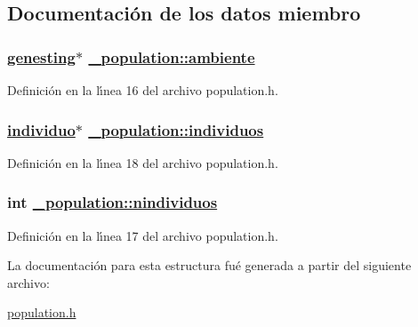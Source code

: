 \subsection{Documentaci\'{o}n de los datos miembro}
\hypertarget{struct__population_68ccc9819f5face92f988074d5b1a8af_68ccc9819f5face92f988074d5b1a8af}{
\subsubsection[ambiente]{\setlength{\rightskip}{0pt plus 5cm}\hyperlink{struct__genesting}{genesting}$\ast$ \hyperlink{struct__population_68ccc9819f5face92f988074d5b1a8af_68ccc9819f5face92f988074d5b1a8af}{\_\-population::ambiente}}}
\label{struct__population_68ccc9819f5face92f988074d5b1a8af_68ccc9819f5face92f988074d5b1a8af}




Definici\'{o}n en la l\'{\i}nea 16 del archivo population.h.\hypertarget{struct__population_3c05b6054f79c3c7993559e3148752a9_3c05b6054f79c3c7993559e3148752a9}{
\subsubsection[individuos]{\setlength{\rightskip}{0pt plus 5cm}\hyperlink{struct__individuo}{individuo}$\ast$ \hyperlink{struct__population_3c05b6054f79c3c7993559e3148752a9_3c05b6054f79c3c7993559e3148752a9}{\_\-population::individuos}}}
\label{struct__population_3c05b6054f79c3c7993559e3148752a9_3c05b6054f79c3c7993559e3148752a9}




Definici\'{o}n en la l\'{\i}nea 18 del archivo population.h.\hypertarget{struct__population_6dc56f2e17990f5e0ae27324e27f948e_6dc56f2e17990f5e0ae27324e27f948e}{
\subsubsection[nindividuos]{\setlength{\rightskip}{0pt plus 5cm}int \hyperlink{struct__population_6dc56f2e17990f5e0ae27324e27f948e_6dc56f2e17990f5e0ae27324e27f948e}{\_\-population::nindividuos}}}
\label{struct__population_6dc56f2e17990f5e0ae27324e27f948e_6dc56f2e17990f5e0ae27324e27f948e}




Definici\'{o}n en la l\'{\i}nea 17 del archivo population.h.

La documentaci\'{o}n para esta estructura fu\'{e} generada a partir del siguiente archivo:\begin{CompactItemize}
\item 
\hyperlink{population_8h}{population.h}\end{CompactItemize}
